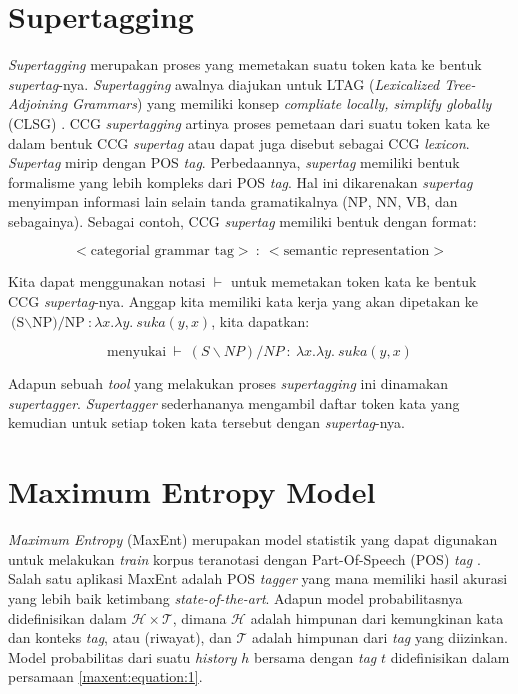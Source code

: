 \section{Supertagging}
\textit{Supertagging} merupakan proses yang memetakan suatu token kata ke bentuk
\textit{supertag}-nya.
\textit{Supertagging} awalnya diajukan untuk LTAG (\textit{Lexicalized Tree-Adjoining Grammars})
yang memiliki konsep \textit{compliate locally, simplify globally} (CLSG)
\cite{DBLP:journals/corr/Rama14b}.
CCG \textit{supertagging} artinya proses pemetaan dari suatu token
kata ke dalam bentuk CCG \textit{supertag} atau dapat juga disebut sebagai CCG \textit{lexicon}.
\textit{Supertag} mirip dengan POS \textit{tag}.
Perbedaannya, \textit{supertag} memiliki bentuk formalisme yang lebih kompleks dari POS
\textit{tag}.
Hal ini dikarenakan \textit{supertag} menyimpan informasi lain selain tanda gramatikalnya
($\text{NP}$, $\text{NN}$, $\text{VB}$, dan sebagainya).
Sebagai contoh, CCG \textit{supertag} memiliki bentuk dengan format:

\begin{equation*}
<\text{categorial\ grammar\ tag}>\ :\ <\text{semantic\ representation}>
\end{equation*}

Kita dapat menggunakan notasi $\vdash$ untuk memetakan token kata ke bentuk CCG
\textit{supertag}-nya.
Anggap kita memiliki kata kerja  yang akan dipetakan ke
$\text{(S{$\backslash$}NP)/NP}: \lambda x.\lambda y.\ suka(y, x)$, kita dapatkan:

\begin{equation*}
  \text{menyukai}\ \vdash\ (S{\backslash}NP)/NP\ :\ \lambda x.\lambda y.\ suka(y, x)
\end{equation*}

Adapun sebuah \textit{tool} yang melakukan proses \textit{supertagging} ini dinamakan
\textit{supertagger}.
\textit{Supertagger} sederhananya mengambil daftar token kata yang kemudian untuk setiap
token kata tersebut  dengan \textit{supertag}-nya.


\section{Maximum Entropy Model}
\textit{Maximum Entropy} (MaxEnt) merupakan model statistik yang dapat digunakan untuk
melakukan \textit{train} korpus teranotasi dengan Part-Of-Speech (POS) \textit{tag}
\cite{Ratnaparkhi96amaximum}.
Salah satu aplikasi MaxEnt adalah POS \textit{tagger} yang mana memiliki hasil akurasi
yang lebih baik ketimbang \textit{state-of-the-art}.
Adapun model probabilitasnya didefinisikan dalam $\mathcal{H}\times\mathcal{T}$,
dimana $\mathcal{H}$ adalah himpunan dari kemungkinan kata dan konteks \textit{tag},
atau  (riwayat), dan $\mathcal{T}$ adalah himpunan dari
\textit{tag} yang diizinkan.
Model probabilitas dari suatu \textit{history} $h$ bersama dengan \textit{tag} $t$
didefinisikan dalam persamaan \ref{maxent:equation:1}.

